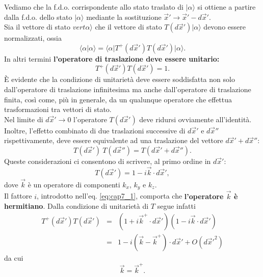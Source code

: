 Vediamo che la f.d.o. corrispondente allo stato traslato di $\vert \alpha \rangle $ si ottiene a partire dalla f.d.o. dello stato $\vert \alpha \rangle $ mediante la sostituzione $\vec{x}' \rightarrow \vec{x}'-d\vec{x}'$.\\
Sia il vettore di stato $vert \alpha \rangle$ che il vettore di stato $T(d\vec{x}') \vert \alpha \rangle$ devono essere normalizzati, ossia
\begin{equation}
\langle \alpha \vert \alpha \rangle = \langle \alpha \vert T^+(d\vec{x}') T(d\vec{x}') \vert \alpha \rangle .
\end{equation}
In altri termini \textbf{l'operatore di traslazione deve essere unitario:}
\begin{equation}
T^+(d\vec{x}') T(d\vec{x}') =1 .
\end{equation}
È evidente che la condizione di unitarietà deve essere soddisfatta non solo dall'operatore di traslazione infinitesima ma anche dall'operatore di traslazione finita, così come, più in generale, da un qualunque operatore che effettua trasformazioni tra vettori di stato.\\
Nel limite di $d\vec{x}' \rightarrow 0$ l'operatore $T(d\vec{x}')$ deve ridursi ovviamente all'identità. Inoltre, l'effetto combinato di due traslazioni successive di $d\vec{x}'$ e $d\vec{x}''$ rispettivamente, deve essere equivalente ad una traslazione del vettore $d\vec{x}'+d\vec{x}''$: 
\begin{equation}
T(d\vec{x}')\ T(d\vec{x}'') = T(d\vec{x}'+d\vec{x}'').
\end{equation}
Queste considerazioni ci consentono di scrivere, al primo ordine in $d\vec{x}'$:
\begin{equation}
\label{eq:cap7_1}
T(d\vec{x}')=1-i\vec{k}\cdot d\vec{x}' ,
\end{equation}
dove $\vec{k}$ è un operatore di componenti $k_x$, $k_y$ e $k_z$.\\
Il fattore $i$, introdotto nell'eq. \eqref{eq:cap7_1}, comporta che \textbf{l'operatore ${\vec{k}}$ è hermitiano}. Dalla condizione di unitarietà di $T$ segue infatti
\begin{eqnarray}
T^+(d\vec{x}') T(d\vec{x}') & = & \left(1+i\vec{k}^+\cdot d\vec{x}'\right) \left(1-i\vec{k}\cdot d\vec{x}'\right) \nonumber \\ 
& = & 1-i\left(\vec{k}-\vec{k}^+\right)\cdot d\vec{x}'+O({d\vec{x}' }^2) 
\end{eqnarray}
da cui
\begin{equation}
\vec{k}=\vec{k}^+ .
\end{equation}
